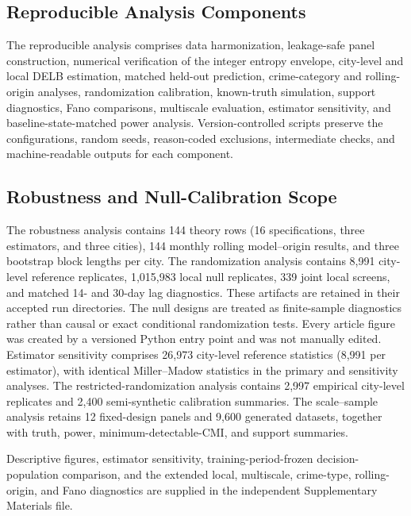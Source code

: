\FloatBarrier
{}

\subsection{Reproducible Analysis Components}
\label{app:experiment_lineage}

The reproducible analysis comprises data harmonization, leakage-safe panel
construction, numerical verification of the integer entropy envelope,
city-level and local DELB estimation, matched held-out prediction,
crime-category and rolling-origin analyses, randomization calibration,
known-truth simulation, support diagnostics, Fano comparisons, multiscale
evaluation, estimator sensitivity, and baseline-state-matched power
analysis. Version-controlled scripts preserve the configurations, random
seeds, reason-coded exclusions, intermediate checks, and machine-readable
outputs for each component.

\subsection{Robustness and Null-Calibration Scope}
\label{app:robustness_scope}

The robustness analysis contains 144 theory rows (16 specifications, three
estimators, and three cities), 144 monthly rolling model--origin results, and
three bootstrap block lengths per city. The randomization analysis contains
8,991 city-level reference
replicates, 1,015,983 local null replicates, 339 joint local screens, and
matched 14- and 30-day lag diagnostics. These artifacts are retained in
their accepted run directories. The null designs are treated
as finite-sample diagnostics rather than causal or exact conditional
randomization tests. Every article figure was created by a versioned Python
entry point and was not manually edited. Estimator sensitivity comprises
26,973 city-level reference statistics (8,991 per estimator), with identical
Miller--Madow statistics in the primary and sensitivity analyses. The
restricted-randomization analysis contains 2,997 empirical city-level
replicates and 2,400 semi-synthetic calibration summaries. The scale--sample
analysis retains 12 fixed-design panels and 9,600 generated datasets, together
with truth, power, minimum-detectable-CMI, and support summaries.

Descriptive figures, estimator sensitivity, training-period-frozen
decision-population comparison, and the extended local, multiscale,
crime-type, rolling-origin, and Fano diagnostics are supplied in the
independent Supplementary Materials file.

